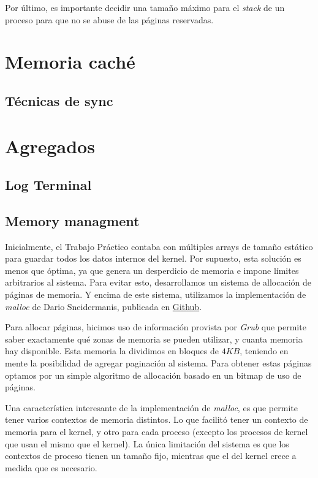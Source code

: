 \documentclass[a4paper,10pt]{article}
\begin{document}
Por último, es importante decidir una tamaño máximo para el \textit{stack} de un proceso para que no se abuse de las páginas 
reservadas.

\newpage

\section{Memoria caché}

\subsection{Técnicas de sync}

\newpage
\section{Agregados}

\subsection{Log Terminal}

\subsection{Memory managment}
Inicialmente, el Trabajo Práctico contaba con múltiples arrays de tamaño estático para guardar todos los datos internos del kernel.
Por supuesto, esta solución es menos que óptima, ya que genera un desperdicio de memoria e impone límites arbitrarios al sistema.
Para evitar esto, desarrollamos un sistema de allocación de páginas de memoria.
Y encima de este sistema, utilizamos la implementación de \textit{malloc} de Dario Sneidermanis, publicada en \href{https://github.com/esneider/malloc}{Github}.

Para allocar páginas, hicimos uso de información provista por \textit{Grub} que permite saber exactamente qué zonas de memoria se pueden utilizar, 
y cuanta memoria hay disponible.
Esta memoria la dividimos en bloques de $4KB$, teniendo en mente la posibilidad de agregar paginación al sistema.
Para obtener estas páginas optamos por un simple algoritmo de allocación basado en un bitmap de uso de páginas.

Una característica interesante de la implementación de \textit{malloc}, es que permite tener varios contextos de memoria distintos.
Lo que facilitó tener un contexto de memoria para el kernel, y otro para cada proceso (excepto los procesos de kernel que usan el mismo que el kernel).
La única limitación del sistema es que los contextos de proceso tienen un tamaño fijo, mientras que el del kernel crece a medida que es necesario.
\end{document}
